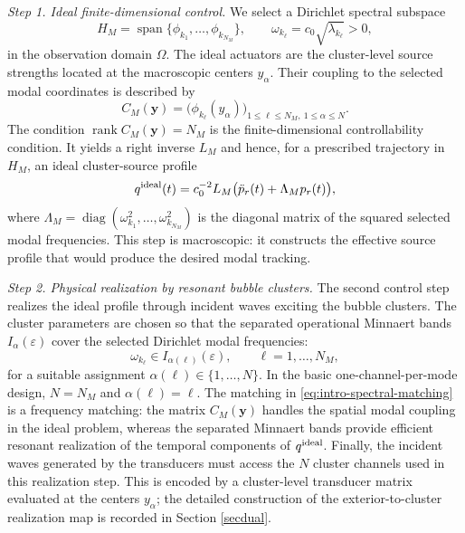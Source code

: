 \documentclass[11pt,a4paper]{article}
\numberwithin{equation}{section}
\begin{document}
\smallskip
\noindent
\textit{Step 1. Ideal finite-dimensional control.}
We select a Dirichlet spectral subspace
\[
        H_M=\operatorname{span}\{\phi_{k_1},\ldots,\phi_{k_{N_M}}\},
        \qquad
        \omega_{k_\ell}=c_0\sqrt{\lambda_{k_\ell}}>0,
\]
in the observation domain $\Omega$. The ideal actuators are the cluster-level source strengths located at the macroscopic centers $y_\alpha$. Their coupling to the selected modal coordinates is described by
\begin{equation}
\label{eq:intro-mode-cluster-matrix}
        C_M(\mathbf y)
        =\bigl(\phi_{k_\ell}(y_\alpha)\bigr)_
        {1\le \ell\le N_M,\ 1\le \alpha\le N}.
\end{equation}
The condition $\operatorname{rank}C_M(\mathbf y)=N_M$ is the finite-dimensional controllability condition. It yields a right inverse $L_M$ and hence, for a prescribed trajectory in $H_M$, an ideal cluster-source profile
\[
        q^{\rm ideal}(t)
        =c_0^{-2}L_M\bigl(\ddot p_r(t)+\Lambda_M p_r(t)\bigr),
\]
where $\Lambda_M=\operatorname{diag}(\omega_{k_1}^2,\ldots,\omega_{k_{N_M}}^2)$ is the diagonal matrix of the squared selected modal frequencies. This step is macroscopic: it constructs the effective source profile that would produce the desired modal tracking.

\smallskip
\noindent
\textit{Step 2. Physical realization by resonant bubble clusters.}
The second control step realizes the ideal profile through incident waves exciting the bubble clusters. The cluster parameters are chosen so that the separated operational Minnaert bands $I_\alpha(\varepsilon)$ cover the selected Dirichlet modal frequencies:
\begin{equation}
\label{eq:intro-spectral-matching}
        \omega_{k_\ell}\in I_{\alpha(\ell)}(\varepsilon),
        \qquad \ell=1,\ldots,N_M,
\end{equation}
for a suitable assignment $\alpha(\ell)\in\{1,\ldots,N\}$. In the basic one-channel-per-mode design, $N=N_M$ and $\alpha(\ell)=\ell$. The matching in \eqref{eq:intro-spectral-matching} is a frequency matching: the matrix $C_M(\mathbf y)$ handles the spatial modal coupling in the ideal problem, whereas the separated Minnaert bands provide efficient resonant realization of the temporal components of $q^{\rm ideal}$. Finally, the incident waves generated by the transducers must access the $N$ cluster channels used in this realization step. This is encoded by a cluster-level transducer matrix evaluated at the centers $y_\alpha$; the detailed construction of the exterior-to-cluster realization map is recorded in Section \ref{secdual}.
\bigskip
\end{document}
